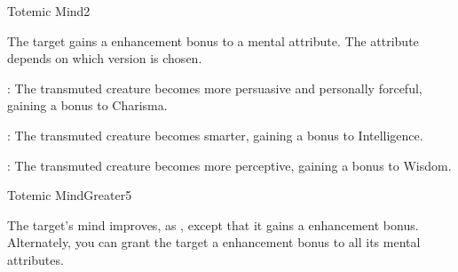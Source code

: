 \begin{spellsection}{Totemic Mind}{2}
\begin{spellheader}
    \begin{spelltargetinginfo}
    \end{spelltargetinginfo}
\end{spellheader}
\begin{spellcontent}
    \begin{spelleffects}
        \spelleffect The target gains a  enhancement bonus to a mental attribute. The attribute depends on which version is chosen.
        \par {}: The transmuted creature becomes more persuasive and personally forceful, gaining a bonus to Charisma.
        \par {}: The transmuted creature becomes smarter, gaining a bonus to Intelligence.
        \par {}: The transmuted creature becomes more perceptive, gaining a bonus to Wisdom.
        \spelldur \durshort
    \end{spelleffects}
\end{spellcontent}
\begin{spellfooter}
\end{spellfooter}
\end{spellsection}

\begin{spellsection}{Totemic Mind}{Greater}{5}
\begin{spellheader}
    \begin{spelltargetinginfo}
    \end{spelltargetinginfo}
\end{spellheader}
\begin{spellcontent}
    \begin{spelleffects}
        \spelleffect The target's mind improves, as , except that it gains a  enhancement bonus. Alternately, you can grant the target a  enhancement bonus to all its mental attributes.
        \spelldur \durshort
    \end{spelleffects}
\end{spellcontent}
\begin{spellfooter}
\end{spellfooter}
\end{spellsection}

